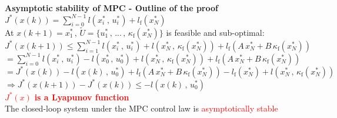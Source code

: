 \textbf{Asymptotic stability of MPC - Outline of the proof}\\
$J^*(x(k))=\sum_{i=0}^{N-1}l(x_i^*\,,\,u_i^*)+l_\text{f}(x_N^*)$\\
At $x(k+1)=x_1^*\,,\,\tilde{U}=\{u_1^*\,,\,...\,,\,\kappa_\text{f}(x_N^*)\}$ is feasible and sub-optimal:\\
$J^*(x(k+1))\leq\sum_{i=1}^{N-1}l(x_i^*\,,\,u_i^*)+l(x_N^*\,,\,\kappa_\text{f}(x_N^*))+l_\text{f}(A\,x_N^*+B\,\kappa_\text{f}(x_N^*))$\\
$=\sum_{i=0}^{N-1}l(x_i^*\,,\,u_i^*)-l(x_0^*\,,\,u_0^*)+l(x_N^*\,,\,\kappa_\text{f}(x_N^*))+l_\text{f}(A\,x_N^*+B\,\kappa_\text{f}(x_N^*))$\\
$=J^*(x(k))-l(x(k)\,,\,u_0^*)+l_\text{f}(A\,x_N^*+B\,\kappa_\text{f}(x_N^*))-l_\text{f}(x_N^*)+l(x_N^*\,,\,\kappa_\text{f}(x_N^*))$\\
$\Rightarrow J^*(x(k+1))-J^*(x(k))\leq-l(x(k)\,,\,u_0^*)$\\
\textcolor{red}{$J^*(x)$ \textbf{ is a Lyapunov function}}\\
\Rightarrow The closed-loop system under the MPC control law is \textcolor{red}{asymptotically stable}\\
